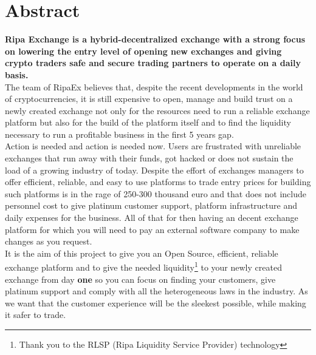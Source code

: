 \documentclass[11pt,fleqn]{book} %
\begin{document}
\chapter{Abstract}
\textbf{Ripa Exchange is a hybrid-decentralized exchange with a strong focus on lowering the entry level
of opening new exchanges and giving crypto traders safe and secure trading partners to operate on a daily basis.}\\

The team of RipaEx believes that, despite the recent developments in the world of
cryptocurrencies, it is still expensive to open, manage and build trust on a newly created exchange not
only for the resources need to run a reliable exchange platform but also for the build of the platform 
itself and to find the liquidity necessary to run a profitable business in the first 5 years gap.\\

Action is needed and action is needed now. Users are frustrated with unreliable exchanges that run away
with their funds, got hacked or does not sustain the load of a growing industry of today. Despite
the effort of exchanges managers to offer efficient, reliable, and easy to use platforms to trade entry
prices for building such platforms is in the rage of 250-300 thousand euro and that does not 
include personnel cost to give platinum customer support, platform infrastructure and daily expenses for
the business. All of that for then having an decent exchange platform for which you will need to pay an 
external software company to make changes as you request.\\

It is the aim of this project to give you an Open Source, efficient, reliable exchange platform and to
give the needed liquidity\footnote{Thank you to the RLSP (Ripa Liquidity Service Provider) technology} to your newly created 
exchange from day \textbf{one} so you can focus on finding your customers, give platinum support and comply with all the heterogeneous 
laws in the industry. 
As we want that the customer experience will be the sleekest possible, while making it safer to trade.\\
\usechapterimagetrue

{} %
\renewcommand*\contentsname{Table of Contents}
\tableofcontents %
\cleardoublepage %
\pagestyle{fancy} %
\end{document}
